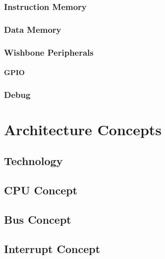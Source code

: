 \subsection{Instruction Memory}

\subsection{Data Memory}

\subsection{Wishbone Peripherals}
\subsubsection{GPIO}

\subsection{Debug}


\chapter{Architecture Concepts}



\section{Technology}
\label{sec:archtech}


\section{CPU Concept}
\label{sec:archcpu}





\section{Bus Concept}


\section{Interrupt Concept}
\label{sec:archirq}


